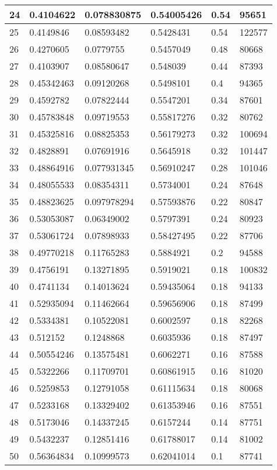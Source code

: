 \begin{longtable}{|l|l|l|l|l|l|}
24 & 0.4104622 & 0.078830875 & 0.54005426 & 0.54 & 95651 \\ \hline 
25 & 0.4149846 & 0.08593482 & 0.5428431 & 0.54 & 122577 \\ \hline 
26 & 0.4270605 & 0.0779755 & 0.5457049 & 0.48 & 80668 \\ \hline 
27 & 0.4103907 & 0.08580647 & 0.548039 & 0.44 & 87393 \\ \hline 
28 & 0.45342463 & 0.09120268 & 0.5498101 & 0.4 & 94365 \\ \hline 
29 & 0.4592782 & 0.07822444 & 0.5547201 & 0.34 & 87601 \\ \hline 
30 & 0.45783848 & 0.09719553 & 0.55817276 & 0.32 & 80762 \\ \hline 
31 & 0.45325816 & 0.08825353 & 0.56179273 & 0.32 & 100694 \\ \hline 
32 & 0.4828891 & 0.07691916 & 0.5645918 & 0.32 & 101447 \\ \hline 
33 & 0.48864916 & 0.077931345 & 0.56910247 & 0.28 & 101046 \\ \hline 
34 & 0.48055533 & 0.08354311 & 0.5734001 & 0.24 & 87648 \\ \hline 
35 & 0.48823625 & 0.097978294 & 0.57593876 & 0.22 & 80847 \\ \hline 
36 & 0.53053087 & 0.06349002 & 0.5797391 & 0.24 & 80923 \\ \hline 
37 & 0.53061724 & 0.07898933 & 0.58427495 & 0.22 & 87706 \\ \hline 
38 & 0.49770218 & 0.11765283 & 0.5884921 & 0.2 & 94588 \\ \hline 
39 & 0.4756191 & 0.13271895 & 0.5919021 & 0.18 & 100832 \\ \hline 
40 & 0.4741134 & 0.14013624 & 0.59435064 & 0.18 & 94133 \\ \hline 
41 & 0.52935094 & 0.11462664 & 0.59656906 & 0.18 & 87499 \\ \hline 
42 & 0.5334381 & 0.10522081 & 0.6002597 & 0.18 & 82268 \\ \hline 
43 & 0.512152 & 0.1248868 & 0.6035936 & 0.18 & 87497 \\ \hline 
44 & 0.50554246 & 0.13575481 & 0.6062271 & 0.16 & 87588 \\ \hline 
45 & 0.5322266 & 0.11709701 & 0.60861915 & 0.16 & 81020 \\ \hline 
46 & 0.5259853 & 0.12791058 & 0.61115634 & 0.18 & 80068 \\ \hline 
47 & 0.5233168 & 0.13329402 & 0.61353946 & 0.16 & 87551 \\ \hline 
48 & 0.5173046 & 0.14337245 & 0.6157244 & 0.14 & 87751 \\ \hline 
49 & 0.5432237 & 0.12851416 & 0.61788017 & 0.14 & 81002 \\ \hline 
50 & 0.56364834 & 0.10999573 & 0.62041014 & 0.1 & 87741 \\ \hline 
\end{longtable}
